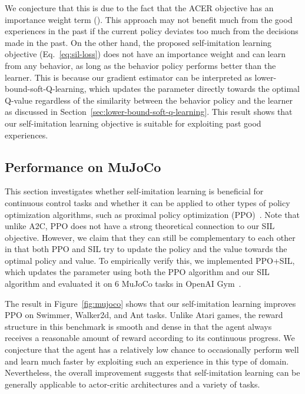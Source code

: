 \documentclass{article}
\newcommand{\cutsubsectionup}{\vspace*{-0.05in}}\newcommand{\cutsubsectiondown}{\vspace*{-0.05in}}
\begin{document}
We conjecture that this is due to the fact that the ACER objective has an importance weight term (). This approach may not benefit much from the good experiences in the past if the current policy deviates too much from the decisions made in the past. On the other hand, the proposed self-imitation learning objective (Eq.~\ref{eq:sil-loss}) does not have an importance weight and can learn from any behavior, as long as the behavior policy performs better than the learner. This is because our gradient estimator can be interpreted as lower-bound-soft-Q-learning, which updates the parameter directly towards the optimal Q-value regardless of the similarity between the behavior policy and the learner as discussed in Section~\ref{sec:lower-bound-soft-q-learning}.
This result shows that our self-imitation learning objective is suitable for exploiting past good experiences.

\cutsubsectionup
\subsection{Performance on MuJoCo}
\cutsubsectiondown
This section investigates whether self-imitation learning is beneficial for continuous control tasks and whether it can be applied to other types of policy optimization algorithms, such as proximal policy optimization (PPO)~\citep{Schulman2017ProximalPO}. Note that unlike A2C, PPO does not have a strong theoretical connection to our SIL objective. However, we claim that they can still be complementary to each other in that both PPO and SIL try to update the policy and the value towards the optimal policy and value.
To empirically verify this, we implemented PPO+SIL, which updates the parameter using both the PPO algorithm and our SIL algorithm and evaluated it on 6 MuJoCo tasks in OpenAI Gym~\citep{brockman2016openai}. 

The result in Figure~\ref{fig:mujoco} shows that our self-imitation learning improves PPO on Swimmer, Walker2d, and Ant tasks. 
Unlike Atari games, the reward structure in this benchmark is smooth and dense in that the agent always receives a reasonable amount of reward according to its continuous progress. We conjecture that the agent has a relatively low chance to occasionally perform well and learn much faster by exploiting such an experience in this type of domain. 
Nevertheless, the overall improvement suggests that self-imitation learning can be generally applicable to actor-critic architectures and a variety of tasks. 
\end{document}
